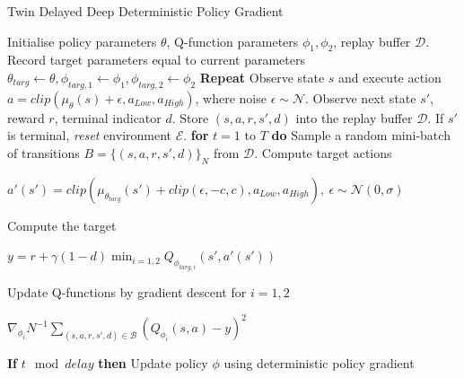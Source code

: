 \documentclass[oneside,11pt,a4paper]{article}
\begin{document}
\begin{algorithm}[H]
    \renewcommand{\thealgorithm}{}
    \caption{Twin Delayed Deep Deterministic Policy Gradient}
    \begin{algorithmic}[1]
        \STATE Initialise policy parameters $\theta$, Q-function parameters $\phi_1, \phi_2$, replay buffer $\mathcal D$.
        \STATE Record target parameters equal to current parameters $\theta_{targ} \leftarrow \theta, \phi_{targ,1} \leftarrow \phi_1, \phi_{targ,2} \leftarrow \phi_2$
        \STATE \textbf{Repeat}
        \STATE \hspace{0.5cm} Observe state $s$ and execute action $a=clip(\mu_\theta(s)+\epsilon, a_{Low}, a_{High})$, where noise $\epsilon \sim \mathcal N$.
        \STATE \hspace{0.5cm} Observe next state $s'$, reward $r$, terminal indicator $d$.
        \STATE \hspace{0.5cm} Store $(s,a,r,s',d)$ into the replay buffer $\mathcal D$.
        \STATE \hspace{0.5cm} If $s'$ is terminal, \textit{reset} environment $\mathcal E$.
        \STATE \hspace{0.5cm} \textbf{for} $t=1$ to $T$ \textbf{do}
        \STATE \hspace{1cm} Sample a random mini-batch of transitions $B = \{(s,a,r,s',d)\}_N$ from $\mathcal D$.
        \STATE \hspace{1cm} Compute target actions
        \begin{center}
            $a'(s') = clip(\mu_{\theta_{targ}}(s')+clip(\epsilon, -c, c),a_{Low}, a_{High}), \ \epsilon \sim \mathcal N (0,\sigma)$
        \end{center}
        \STATE \hspace{1cm} Compute the target
        \begin{center}
            $y = r+\gamma(1-d)\min_{i=1,2}Q_{\phi_{targ,i}}(s',a'(s'))$
        \end{center}
        \STATE \hspace{1cm} Update Q-functions by gradient descent for $i=1,2$
        \begin{center}
            $\nabla_{\phi_i} N^{-1}\sum\limits_{(s,a,r,s',d)\in\mathcal B}(Q_{\phi_i}(s,a) -y)^2$
        \end{center}
        \STATE \hspace{1cm} \textbf{If} $t \mod delay$ \textbf{then}
        \STATE \hspace{1.5cm} Update policy $\phi$ using deterministic policy gradient

\end{algorithmic}
\end{algorithm}
\end{document}
